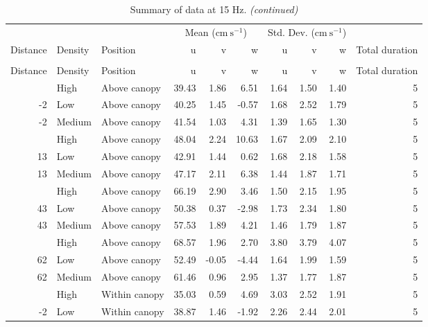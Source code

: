 \documentclass[10pt,]{article}
\begin{document}
\clearpage
\begingroup\fontsize{7}{9}\selectfont

\begin{longtable}{rllrrrrrrr}
\caption{\label{tab:unnamed-chunk-2}Summary of data at 15 Hz.}\\
\toprule
\multicolumn{3}{c}{ } & \multicolumn{3}{c}{Mean ($\text{cm}~\text{s}^{-1}$)} & \multicolumn{3}{c}{Std. Dev. ($\text{cm}~\text{s}^{-1}$)} \\
\cmidrule(l{2pt}r{2pt}){4-6} \cmidrule(l{2pt}r{2pt}){7-9}
Distance & Density & Position & u & v & w & u & v & w & Total duration\\
\midrule
\endfirsthead
\caption[]{\label{tab:unnamed-chunk-2}Summary of data at 15 Hz. \textit{(continued)}}\\
\toprule
Distance & Density & Position & u & v & w & u & v & w & Total duration\\
\midrule
\endhead
\
\endfoot
\bottomrule
\endlastfoot
-2 & High & Above canopy & 39.43 & 1.86 & 6.51 & 1.64 & 1.50 & 1.40 & 5\\
-2 & Low & Above canopy & 40.25 & 1.45 & -0.57 & 1.68 & 2.52 & 1.79 & 5\\
-2 & Medium & Above canopy & 41.54 & 1.03 & 4.31 & 1.39 & 1.65 & 1.30 & 5\\
\addlinespace
13 & High & Above canopy & 48.04 & 2.24 & 10.63 & 1.67 & 2.09 & 2.10 & 5\\
13 & Low & Above canopy & 42.91 & 1.44 & 0.62 & 1.68 & 2.18 & 1.58 & 5\\
13 & Medium & Above canopy & 47.17 & 2.11 & 6.38 & 1.44 & 1.87 & 1.71 & 5\\
\addlinespace
43 & High & Above canopy & 66.19 & 2.90 & 3.46 & 1.50 & 2.15 & 1.95 & 5\\
43 & Low & Above canopy & 50.38 & 0.37 & -2.98 & 1.73 & 2.34 & 1.80 & 5\\
43 & Medium & Above canopy & 57.53 & 1.89 & 4.21 & 1.46 & 1.79 & 1.87 & 5\\
\addlinespace
62 & High & Above canopy & 68.57 & 1.96 & 2.70 & 3.80 & 3.79 & 4.07 & 5\\
62 & Low & Above canopy & 52.49 & -0.05 & -4.44 & 1.64 & 1.99 & 1.59 & 5\\
62 & Medium & Above canopy & 61.46 & 0.96 & 2.95 & 1.37 & 1.77 & 1.87 & 5\\
\addlinespace
-2 & High & Within canopy & 35.03 & 0.59 & 4.69 & 3.03 & 2.52 & 1.91 & 5\\
-2 & Low & Within canopy & 38.87 & 1.46 & -1.92 & 2.26 & 2.44 & 2.01 & 5\\

\end{longtable}
\end{document}
